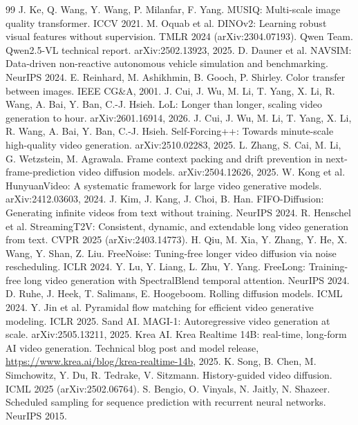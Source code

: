 \begin{thebibliography}{99}
 J. Ke, Q. Wang, Y. Wang, P. Milanfar, F. Yang. MUSIQ: Multi-scale image quality transformer. ICCV 2021.
 M. Oquab et al. DINOv2: Learning robust visual features without supervision. TMLR 2024 (arXiv:2304.07193).
 Qwen Team. Qwen2.5-VL technical report. arXiv:2502.13923, 2025.
 D. Dauner et al. NAVSIM: Data-driven non-reactive autonomous vehicle simulation and benchmarking. NeurIPS 2024.
 E. Reinhard, M. Ashikhmin, B. Gooch, P. Shirley. Color transfer between images. IEEE CG\&A, 2001.
 J. Cui, J. Wu, M. Li, T. Yang, X. Li, R. Wang, A. Bai, Y. Ban, C.-J. Hsieh. LoL: Longer than longer, scaling video generation to hour. arXiv:2601.16914, 2026.
 J. Cui, J. Wu, M. Li, T. Yang, X. Li, R. Wang, A. Bai, Y. Ban, C.-J. Hsieh. Self-Forcing++: Towards minute-scale high-quality video generation. arXiv:2510.02283, 2025.
 L. Zhang, S. Cai, M. Li, G. Wetzstein, M. Agrawala. Frame context packing and drift prevention in next-frame-prediction video diffusion models. arXiv:2504.12626, 2025.
 W. Kong et al. HunyuanVideo: A systematic framework for large video generative models. arXiv:2412.03603, 2024.
 J. Kim, J. Kang, J. Choi, B. Han. FIFO-Diffusion: Generating infinite videos from text without training. NeurIPS 2024.
 R. Henschel et al. StreamingT2V: Consistent, dynamic, and extendable long video generation from text. CVPR 2025 (arXiv:2403.14773).
 H. Qiu, M. Xia, Y. Zhang, Y. He, X. Wang, Y. Shan, Z. Liu. FreeNoise: Tuning-free longer video diffusion via noise rescheduling. ICLR 2024.
 Y. Lu, Y. Liang, L. Zhu, Y. Yang. FreeLong: Training-free long video generation with SpectralBlend temporal attention. NeurIPS 2024.
 D. Ruhe, J. Heek, T. Salimans, E. Hoogeboom. Rolling diffusion models. ICML 2024.
 Y. Jin et al. Pyramidal flow matching for efficient video generative modeling. ICLR 2025.
 Sand AI. MAGI-1: Autoregressive video generation at scale. arXiv:2505.13211, 2025.
 Krea AI. Krea Realtime 14B: real-time, long-form AI video generation. Technical blog post and model release, \url{https://www.krea.ai/blog/krea-realtime-14b}, 2025.
 K. Song, B. Chen, M. Simchowitz, Y. Du, R. Tedrake, V. Sitzmann. History-guided video diffusion. ICML 2025 (arXiv:2502.06764).
 S. Bengio, O. Vinyals, N. Jaitly, N. Shazeer. Scheduled sampling for sequence prediction with recurrent neural networks. NeurIPS 2015.

\end{thebibliography}
